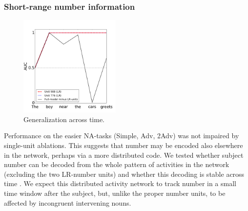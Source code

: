 \subsubsection{Short-range number information}
\begin{figure}[h]
    \centering
    \includegraphics[height=5cm]{Figures/GAT1d_cell_nounpp_SR_LR_single_unit.png}
    \caption{Generalization across time. }
    \label{fig:GAT}
\end{figure}

Performance on the easier NA-tasks (Simple, Adv, 2Adv) was not
impaired by single-unit ablations. This suggests that number may be
encoded also elsewhere in the network, perhaps via a more distributed
code. We tested whether subject number can be decoded from the whole
pattern of activities in the network (excluding the two LR-number units)
and whether this decoding is stable across time \cite[see][for similar
observations and related methods]{Giulianelli:etal:2018}. We expect
this distributed activity network to track number in a
small time window after the subject, but, unlike the proper number units,
to be affected by incongruent intervening nouns.

